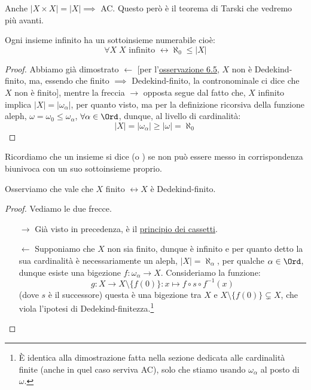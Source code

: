 \documentclass[11pt]{scrartcl}
\begin{document}
\begin{note}
	Anche $|X \times X| = |X| \implies$ AC. Questo però è il teorema di Tarski che vedremo più avanti.
\end{note}


\begin{corollary}
	Ogni insieme infinito ha un sottoinsieme numerabile cioè:
	\[ \forall X \; \text{$X$ infinito $\longleftrightarrow \aleph_0 \leq |X|$}
		\]
\end{corollary}

\begin{proof}
	Abbiamo già dimostrato $\leftarrow$ [per l'\hyperref[omega_Dedekind_finito]{osservazione 6.5}, $X$ non è Dedekind-finito, ma, essendo che finito $\implies$ Dedekind-finito,
	la contronominale ci dice che $X$ non è finito], mentre la freccia $\rightarrow$ opposta segue dal fatto che, $X$ infinito implica $|X| = |\omega_\alpha|$, per quanto visto,
	ma per la definizione ricorsiva della funzione aleph, $\omega = \omega_0 \leq \omega_\alpha$, $\forall \alpha \in \Ord$, dunque, al livello di cardinalità:
	\[ |X| = |\omega_\alpha| \geq |\omega| = \aleph_0
		\]
\end{proof}

Ricordiamo che un insieme si dice  (o ) se non può essere messo in corrispondenza biunivoca con un suo sottoinsieme proprio.

\begin{proposition}
	Osserviamo che vale che $X$ finito $\longleftrightarrow X$ è Dedekind-finito.
\end{proposition}

\begin{proof}
	Vediamo le due frecce.
	\begin{itemize}
		\item[$\boxed{\longrightarrow}$] Già visto in precedenza, è il \hyperref[cassetti]{principio dei cassetti}.
		\item[$\boxed{\longleftarrow}$] Supponiamo che $X$ non sia finito, dunque è infinito e per quanto detto la sua cardinalità è necessariamente un aleph, $|X| = \aleph_\alpha$, per qualche $\alpha \in \Ord$,
		dunque esiste una bigezione $f : \omega_\alpha \rightarrow X$. Consideriamo la funzione:
		\[ g : X \rightarrow X \setminus \{f(0)\} : x \mapsto f \circ s \circ f^{-1}(x)
			\]
		(dove $s$ è il successore) questa è una bigezione tra $X$ e $X \setminus \{f(0)\} \subsetneq X$, che viola l'ipotesi di Dedekind-finitezza.\footnote{È identica alla dimostrazione fatta nella sezione dedicata alle cardinalità finite (anche in quel caso serviva AC), solo che stiamo usando $\omega_\alpha$ al posto di $\omega$.}
	\end{itemize}
\end{proof}
\end{document}
